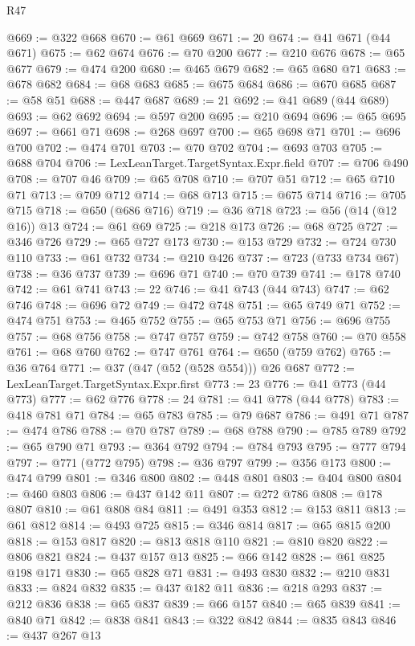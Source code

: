 \begin{lexlean}{R47}
\begin{coremodule}
@669 := @322 @668
@670 := @61 @669
@671 := 20
@674 := @41 @671 (@44 @671)
@675 := @62 @674
@676 := @70 @200
@677 := @210 @676
@678 := @65 @677
@679 := @474 @200
@680 := @465 @679
@682 := @65 @680 @71
@683 := @678 @682
@684 := @68 @683
@685 := @675 @684
@686 := @670 @685
@687 := @58 @51
@688 := @447 @687
@689 := 21
@692 := @41 @689 (@44 @689)
@693 := @62 @692
@694 := @597 @200
@695 := @210 @694
@696 := @65 @695
@697 := @661 @71
@698 := @268 @697
@700 := @65 @698 @71
@701 := @696 @700
@702 := @474 @701
@703 := @70 @702
@704 := @693 @703
@705 := @688 @704
@706 := LexLeanTarget.TargetSyntax.Expr.field
@707 := @706 @490
@708 := @707 @46
@709 := @65 @708
@710 := @707 @51
@712 := @65 @710 @71
@713 := @709 @712
@714 := @68 @713
@715 := @675 @714
@716 := @705 @715
@718 := @650 (@686 @716)
@719 := @36 @718
@723 := @56 (@14 (@12 @16)) @13
@724 := @61 @69
@725 := @218 @173
@726 := @68 @725
@727 := @346 @726
@729 := @65 @727 @173
@730 := @153 @729
@732 := @724 @730 @110
@733 := @61 @732
@734 := @210 @426
@737 := @723 (@733 @734 @67)
@738 := @36 @737
@739 := @696 @71
@740 := @70 @739
@741 := @178 @740
@742 := @61 @741
@743 := 22
@746 := @41 @743 (@44 @743)
@747 := @62 @746
@748 := @696 @72
@749 := @472 @748
@751 := @65 @749 @71
@752 := @474 @751
@753 := @465 @752
@755 := @65 @753 @71
@756 := @696 @755
@757 := @68 @756
@758 := @747 @757
@759 := @742 @758
@760 := @70 @558
@761 := @68 @760
@762 := @747 @761
@764 := @650 (@759 @762)
@765 := @36 @764
@771 := @37 (@47 (@52 (@528 @554))) @26 @687
@772 := LexLeanTarget.TargetSyntax.Expr.first
@773 := 23
@776 := @41 @773 (@44 @773)
@777 := @62 @776
@778 := 24
@781 := @41 @778 (@44 @778)
@783 := @418 @781 @71
@784 := @65 @783
@785 := @79 @687
@786 := @491 @71
@787 := @474 @786
@788 := @70 @787
@789 := @68 @788
@790 := @785 @789
@792 := @65 @790 @71
@793 := @364 @792
@794 := @784 @793
@795 := @777 @794
@797 := @771 (@772 @795)
@798 := @36 @797
@799 := @356 @173
@800 := @474 @799
@801 := @346 @800
@802 := @448 @801
@803 := @404 @800
@804 := @460 @803
@806 := @437 @142 @11
@807 := @272 @786
@808 := @178 @807
@810 := @61 @808 @84
@811 := @491 @353
@812 := @153 @811
@813 := @61 @812
@814 := @493 @725
@815 := @346 @814
@817 := @65 @815 @200
@818 := @153 @817
@820 := @813 @818 @110
@821 := @810 @820
@822 := @806 @821
@824 := @437 @157 @13
@825 := @66 @142
@828 := @61 @825 @198 @171
@830 := @65 @828 @71
@831 := @493 @830
@832 := @210 @831
@833 := @824 @832
@835 := @437 @182 @11
@836 := @218 @293
@837 := @212 @836
@838 := @65 @837
@839 := @66 @157
@840 := @65 @839
@841 := @840 @71
@842 := @838 @841
@843 := @322 @842
@844 := @835 @843
@846 := @437 @267 @13

\end{coremodule}
\end{lexlean}
